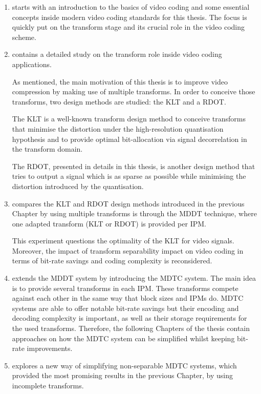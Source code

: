 \documentclass[11pt,a4paper,openright,twoside]{book}
\numberwithin{equation}{section} %
\numberwithin{figure}{section} %
\numberwithin{table}{section} %
\begin{document}
\begin{enumerate}
	[labelindent=3.8em,leftmargin=!,label={\bf Chapter \arabic{enumi}}]
	\item starts with an introduction to the basics of video coding and some
		essential concepts inside modern video coding standards for this
		thesis.
		The focus is quickly put on the transform stage and its crucial role
		in the video coding scheme.

	\item contains a detailed study on the transform role inside video coding
		applications.

		As mentioned, the main motivation of this thesis is to improve video
		compression by making use of multiple transforms.
		In order to conceive those transforms, two design methods are studied:
		the \ac{KLT} and a \ac{RDOT}.

		The \ac{KLT} is a well-known transform design method to conceive
		transforms that minimise the distortion under the high-resolution
		quantisation hypothesis and to provide optimal bit-allocation via
		signal decorrelation in the transform domain.

		The \ac{RDOT}, presented in details in this thesis, is another design
		method that tries to output a signal which is as sparse as possible
		while minimising the distortion introduced by the quantisation.

	\item compares the \ac{KLT} and \ac{RDOT} design methods introduced in the
		previous Chapter by using multiple transforms is through the \ac{MDDT}
		technique, where one adapted transform (\ac{KLT} or \ac{RDOT}) is
		provided per \acl{IPM}.

		This experiment questions the optimality of the \ac{KLT} for video
		signals.
		Moreover, the impact of transform separability impact on video coding
		in terms of bit-rate savings and coding complexity is reconsidered.

	\item extends the \ac{MDDT} system by introducing the \ac{MDTC} system.
		The main idea is to provide several transforms in each \acl{IPM}.
		These transforms compete against each other in the same way that block
		sizes and \aclp{IPM} do.
		\ac{MDTC} systems are able to offer notable bit-rate savings but their
		encoding and decoding complexity is important, as well as their
		storage requirements for the used transforms.
		Therefore, the following Chapters of the thesis contain approaches on
		how the \ac{MDTC} system can be simplified whilst keeping bit-rate
		improvements.
	\item explores a new way of simplifying non-separable \ac{MDTC} systems,
		which provided the most promising results in the previous Chapter, by
		using incomplete transforms.


\end{enumerate}
\end{document}
